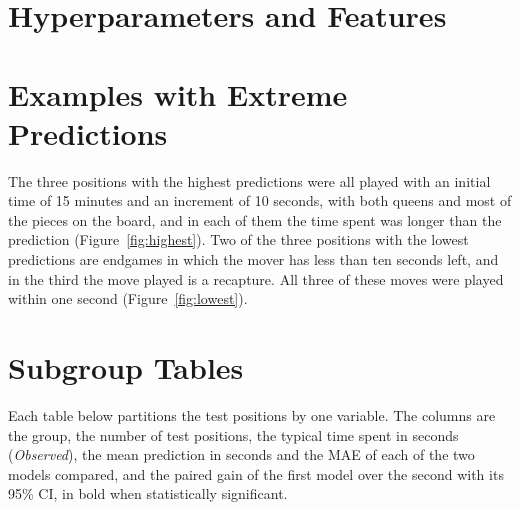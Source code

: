 \documentclass[11pt]{article}
\begin{document}



\clearpage
\appendix

\section{Hyperparameters and Features}

\begin{table}[htbp]\centering\footnotesize
{}
\caption{Hyperparameters of the networks of the fixed sequence, from their
configuration files. \emph{LR} is the peak learning rate. Values shared by
all of them are given below the table.}
\label{tab:settings}
\end{table}

\begin{table}[htbp]\centering\footnotesize
{}
\caption{Hand-crafted features: the inputs of  in addition
to the scalar context features, and of a network whose configuration includes
them.}
\label{tab:hand}
\end{table}

\iflook
\section{Examples with Extreme Predictions}

The three positions with the highest predictions were all played with an
initial time of 15 minutes and an increment of 10 seconds, with both queens
and most of the pieces on the board, and in each of them the time spent was
longer than the prediction (Figure~\ref{fig:highest}). Two of the three
positions with the lowest predictions are endgames in which the mover has
less than ten seconds left, and in the third the move played is a recapture.
All three of these moves were played within one second
(Figure~\ref{fig:lowest}).



\section{Subgroup Tables}

Each table below partitions the test positions by one variable. The columns
are the group, the number of test positions, the typical time spent in
seconds (\emph{Observed}), the mean prediction in seconds and the MAE of each
of the two models compared, and the paired gain of the first model over the
second with its 95\% CI, in bold when statistically significant.

\fi
\end{document}
